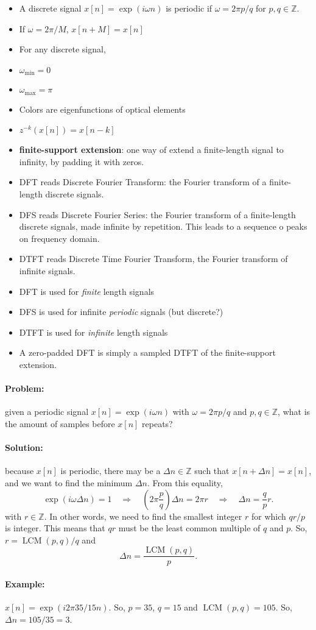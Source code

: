\documentclass[a4paper, 12pt]{article}
\newcommand\integer{\ensuremath{\mathbb{Z}}}
\DeclareMathOperator{\LCM}{LCM}
\newcommand\new[1]{\textbf{#1}}
\begin{document}
\begin{itemize}
	\item A discrete signal $x[n] = \exp(i\omega n)$ is periodic if $\omega = 2\pi p/q$ for $p,q\in\integer$.
	\item If $\omega = 2\pi/M$, $x[n+M] = x[n]$
	\item For any discrete signal,
	\item $\omega_\text{min} = 0$
	\item $\omega_\text{max} = \pi$
	\item Colors are eigenfunctions of optical elements
	\item $z^{-k}\left(x[n]\right) = x[n-k]$
	\item \new{finite-support extension}: one way of extend a finite-length signal to infinity, by padding it with zeros.
	\item DFT reads Discrete Fourier Transform: the Fourier transform of a finite-length discrete signals.
	\item DFS reads Discrete Fourier Series: the Fourier transform of a finite-length discrete signals, made infinite by repetition. This leads to a sequence o peaks on frequency domain.
	\item DTFT reads Discrete Time Fourier Transform, the Fourier transform of infinite signals.
	\item DFT is used for \emph{finite} length signals
	\item DFS is used for infinite \emph{periodic} signals (but discrete?)
	\item DTFT is used for \emph{infinite} length signals
	\item A zero-padded DFT is simply a sampled DTFT of the finite-support extension.
\end{itemize}

	\paragraph{Problem:} given a periodic signal $x[n]=\exp(i\omega n)$ with $\omega = 2\pi p/q$ and $p,q\in\integer$, what is the amount of samples before $x[n]$ repeats?

	\paragraph{Solution:} because $x[n]$ is periodic, there may be a $\Delta n\in\integer$ such that $x[n+\Delta n] = x[n]$, and we want to find the minimum $\Delta n$. From this equality,
	\begin{equation}
	\exp(i\omega\Delta n) = 1 \quad\Rightarrow\quad
		\left(2\pi\frac{p}{q}\right)\Delta n = 2\pi r \quad\Rightarrow\quad
			\Delta n = \frac{q}{p} r.
	\end{equation}
	with $r\in\integer$. In other words, we need to find the smallest integer $r$ for which $qr/p$ is integer. This means that $qr$ must be the least common multiple of $q$ and $p$. So, $r = \LCM(p,q)/q$ and
	\begin{equation}
		\Delta n = \frac{\LCM(p,q)}{p}.
	\end{equation}

	\paragraph{Example:} $x[n]=\exp(i2\pi35/15n)$. So, $p=35$, $q=15$ and $\LCM(p,q) = 105$. So, $\Delta n = 105/35 = 3$.
\end{document}
